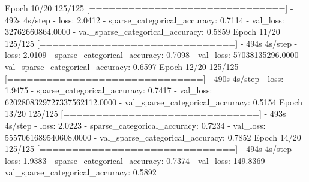 \documentclass[
  12pt,
  a4paper,
]{article}
\newenvironment{Shaded}{}{}
\newcommand{\BuiltInTok}[1]{#1}
\newcommand{\DecValTok}[1]{\textcolor[rgb]{0.25,0.63,0.44}{#1}}
\newcommand{\FloatTok}[1]{\textcolor[rgb]{0.25,0.63,0.44}{#1}}
\newcommand{\NormalTok}[1]{#1}
\newcommand{\OperatorTok}[1]{\textcolor[rgb]{0.40,0.40,0.40}{#1}}
\begin{document}
\begin{Shaded}
\begin{Highlighting}[]
\NormalTok{Epoch }\DecValTok{10}\OperatorTok{/}\DecValTok{20}
\DecValTok{125}\OperatorTok{/}\DecValTok{125} \OperatorTok{[==============================]} \OperatorTok{{-}} \DecValTok{492}\BuiltInTok{s} \DecValTok{4}\BuiltInTok{s}\OperatorTok{/}\NormalTok{step }\OperatorTok{{-}}\NormalTok{ loss}\OperatorTok{:} \FloatTok{2.0412} \OperatorTok{{-}}\NormalTok{ sparse\_categorical\_accuracy}\OperatorTok{:} \FloatTok{0.7114} \OperatorTok{{-}}\NormalTok{ val\_loss}\OperatorTok{:} \FloatTok{32762660864.0000} \OperatorTok{{-}}\NormalTok{ val\_sparse\_categorical\_accuracy}\OperatorTok{:} \FloatTok{0.5859}
\NormalTok{Epoch }\DecValTok{11}\OperatorTok{/}\DecValTok{20}
\DecValTok{125}\OperatorTok{/}\DecValTok{125} \OperatorTok{[==============================]} \OperatorTok{{-}} \DecValTok{494}\BuiltInTok{s} \DecValTok{4}\BuiltInTok{s}\OperatorTok{/}\NormalTok{step }\OperatorTok{{-}}\NormalTok{ loss}\OperatorTok{:} \FloatTok{2.0109} \OperatorTok{{-}}\NormalTok{ sparse\_categorical\_accuracy}\OperatorTok{:} \FloatTok{0.7098} \OperatorTok{{-}}\NormalTok{ val\_loss}\OperatorTok{:} \FloatTok{57038135296.0000} \OperatorTok{{-}}\NormalTok{ val\_sparse\_categorical\_accuracy}\OperatorTok{:} \FloatTok{0.6597}
\NormalTok{Epoch }\DecValTok{12}\OperatorTok{/}\DecValTok{20}
\DecValTok{125}\OperatorTok{/}\DecValTok{125} \OperatorTok{[==============================]} \OperatorTok{{-}} \DecValTok{490}\BuiltInTok{s} \DecValTok{4}\BuiltInTok{s}\OperatorTok{/}\NormalTok{step }\OperatorTok{{-}}\NormalTok{ loss}\OperatorTok{:} \FloatTok{1.9475} \OperatorTok{{-}}\NormalTok{ sparse\_categorical\_accuracy}\OperatorTok{:} \FloatTok{0.7417} \OperatorTok{{-}}\NormalTok{ val\_loss}\OperatorTok{:} \FloatTok{6202808329727337562112.0000} \OperatorTok{{-}}\NormalTok{ val\_sparse\_categorical\_accuracy}\OperatorTok{:} \FloatTok{0.5154}
\NormalTok{Epoch }\DecValTok{13}\OperatorTok{/}\DecValTok{20}
\DecValTok{125}\OperatorTok{/}\DecValTok{125} \OperatorTok{[==============================]} \OperatorTok{{-}} \DecValTok{493}\BuiltInTok{s} \DecValTok{4}\BuiltInTok{s}\OperatorTok{/}\NormalTok{step }\OperatorTok{{-}}\NormalTok{ loss}\OperatorTok{:} \FloatTok{2.0223} \OperatorTok{{-}}\NormalTok{ sparse\_categorical\_accuracy}\OperatorTok{:} \FloatTok{0.7234} \OperatorTok{{-}}\NormalTok{ val\_loss}\OperatorTok{:} \FloatTok{5557061689540608.0000} \OperatorTok{{-}}\NormalTok{ val\_sparse\_categorical\_accuracy}\OperatorTok{:} \FloatTok{0.7852}
\NormalTok{Epoch }\DecValTok{14}\OperatorTok{/}\DecValTok{20}
\DecValTok{125}\OperatorTok{/}\DecValTok{125} \OperatorTok{[==============================]} \OperatorTok{{-}} \DecValTok{494}\BuiltInTok{s} \DecValTok{4}\BuiltInTok{s}\OperatorTok{/}\NormalTok{step }\OperatorTok{{-}}\NormalTok{ loss}\OperatorTok{:} \FloatTok{1.9383} \OperatorTok{{-}}\NormalTok{ sparse\_categorical\_accuracy}\OperatorTok{:} \FloatTok{0.7374} \OperatorTok{{-}}\NormalTok{ val\_loss}\OperatorTok{:} \FloatTok{149.8369} \OperatorTok{{-}}\NormalTok{ val\_sparse\_categorical\_accuracy}\OperatorTok{:} \FloatTok{0.5892}

\end{Highlighting}
\end{Shaded}
\end{document}
